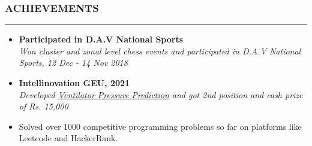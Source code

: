 \documentclass[a4paper]{article}
\begin{document}
\subsubsection*{ACHIEVEMENTS}
\hrule
\vspace{10pt}

\begin{itemize}[leftmargin=*, nosep]
    \item \noindent \textbf{Participated in D.A.V National Sports} \\
          \textit{Won cluster and zonal level chess events and participated in D.A.V National Sports, 12 Dec - 14 Nov 2018}
    \item \noindent \textbf{Intellinovation GEU, 2021} \\
          \textit{Developed \href{https://www.github.com/Bot-7037/Ventilator-Pressure-Prediction}{Ventilator Pressure Prediction} and got 2nd position and cash prize of Rs. 15,000 }
    \item Solved over 1000 competitive programming problems so far on platforms like Leetcode and HackerRank.
\end{itemize}
\end{document}
